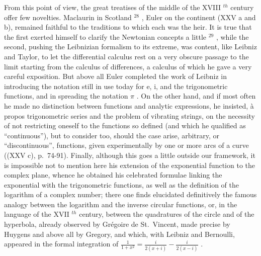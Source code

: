 From this point of view, the great treatises of the middle of the XVIII \(^{th}\) century offer few novelties. Maclaurin in Scotland \(^{28}\) , Euler on the continent (XXV a and b), remained faithful to the traditions to which each was the heir. It is true that the first exerted himself to clarify the Newtonian concepts a little \(^{29}\) , while the second, pushing the Leibnizian formalism to its extreme, was content, like Leibniz and Taylor, to let the differential calculus rest on a very obscure passage to the limit starting from the calculus of differences, a calculus of which he gave a very careful exposition. But above all Euler completed the work of Leibniz in introducing the notation still in use today for e, i, and the trigonometric functions, and in spreading the notation \(\pi\) . On the other hand, and if most often he made no distinction between functions and analytic expressions, he insisted, à propos trigonometric series and the problem of vibrating strings, on the necessity of not restricting oneself to the functions so defined (and which he qualified as ``continuous''), but to consider too, should the case arise, arbitrary, or ``discontinuous'', functions, given experimentally by one or more arcs of a curve ((XXV c), p.~74-91). Finally, although this goes a little outside our framework, it is impossible not to mention here his extension of the exponential function to the complex plane, whence he obtained his celebrated formulae linking the exponential with the trigonometric functions, as well as the definition of the logarithm of a complex number; there one finds elucidated definitively the famous analogy between the logarithm and the inverse circular functions, or, in the language of the XVII \(^{th}\) century, between the quadratures of the circle and of the hyperbola, already observed by Grégoire de St.~Vincent, made precise by Huygens and above all by Gregory, and which, with Leibniz and Bernoulli, appeared in the formal integration of \(\frac{1}{1 + x^{2}} = \frac{i}{2(x + i)} - \frac{i}{2(x - i)}\) .
\relax{}
